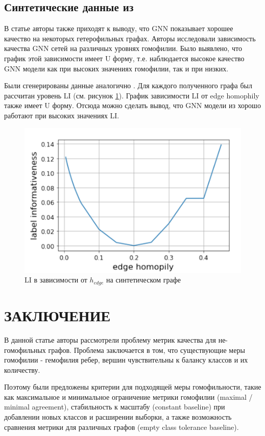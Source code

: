 \documentclass[a4paper,14pt]{article}
\begin{document}
	
	\subsection{Синтетические данные из \cite{luan2021heterophily}}
	
	В  статье \cite{luan2021heterophily} авторы также приходят к выводу, что GNN показывает хорошее качество на некоторых гетерофильных графах.
	Авторы исследовали зависимость качества GNN сетей на различных уровнях гомофилии.
	Было выявлено, что график этой зависимости имеет U форму, т.е. наблюдается высокое качество GNN модели как при высоких значениях гомофилии, так и при низких.
	
	Были сгенерированы данные аналогично \cite{luan2021heterophily}. Для каждого полученного графа был рассчитан уровень LI (см. рисунок \ref{fig:label-informativeness-depending-on-edge-homophily}).
	График зависимости LI от edge homophily также имеет U форму.
	Отсюда можно сделать вывод, что GNN модели из \cite{luan2021heterophily} хорошо работают при высоких значениях LI.
	
	\begin{figure}[H]
		\centering
		\includegraphics[width=0.4\linewidth]{"images/Label informativeness depending on edge homophily"}
		\caption{LI в зависимости от $h_{edge}$ на синтетическом графе \cite{luan2021heterophily}}
		\label{fig:label-informativeness-depending-on-edge-homophily}
	\end{figure}
	
	
	\pagebreak
	
	\section*{ \hfill ЗАКЛЮЧЕНИЕ \hfill}
	
	В данной статье авторы рассмотрели проблему метрик качества для не-гомофильных графов.
	Проблема заключается в том, что существующие меры гомофилии - гемофилия ребер, вершин чувствительны к балансу классов и их количеству. 
	
	Поэтому были предложены критерии для подходящей меры гомофильности, такие как максимальное и минимальное ограничение метрики гомофилии (maximal  / minimal agreement), стабильность к масштабу (constant baseline) при добавлении новых классов и расширении выборки, а также возможность сравнения метрики для различных графов (empty class tolerance baseline).
	
\end{document}
